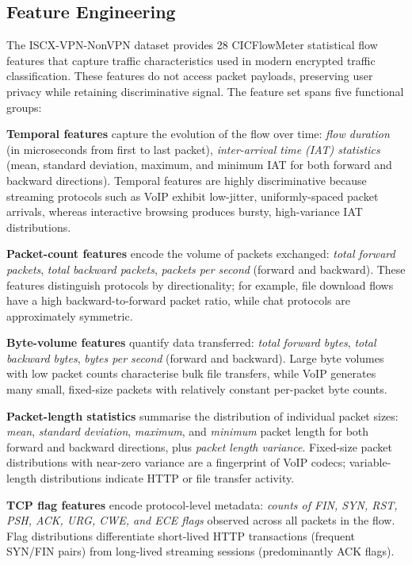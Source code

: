 \documentclass[conference]{IEEEtran}
\begin{document}
\subsection{Feature Engineering}
\label{ssec:features}

The ISCX-VPN-NonVPN dataset provides 28 CICFlowMeter statistical flow features
that capture traffic characteristics used in modern encrypted traffic
classification. These features do not access packet payloads, preserving user
privacy while retaining discriminative signal. The feature set spans five
functional groups:

\textbf{Temporal features} capture the evolution of the flow over time:
\textit{flow duration} (in microseconds from first to last packet),
\textit{inter-arrival time (IAT) statistics} (mean, standard deviation, maximum,
and minimum IAT for both forward and backward directions). Temporal features are
highly discriminative because streaming protocols such as VoIP exhibit low-jitter,
uniformly-spaced packet arrivals, whereas interactive browsing produces bursty,
high-variance IAT distributions.

\textbf{Packet-count features} encode the volume of packets exchanged:
\textit{total forward packets}, \textit{total backward packets},
\textit{packets per second} (forward and backward). These features distinguish
protocols by directionality; for example, file download flows have a high
backward-to-forward packet ratio, while chat protocols are approximately
symmetric.

\textbf{Byte-volume features} quantify data transferred:
\textit{total forward bytes}, \textit{total backward bytes},
\textit{bytes per second} (forward and backward). Large byte volumes with
low packet counts characterise bulk file transfers, while VoIP generates
many small, fixed-size packets with relatively constant per-packet byte counts.

\textbf{Packet-length statistics} summarise the distribution of individual
packet sizes: \textit{mean}, \textit{standard deviation}, \textit{maximum},
and \textit{minimum} packet length for both forward and backward directions,
plus \textit{packet length variance}. Fixed-size packet distributions with
near-zero variance are a fingerprint of VoIP codecs; variable-length
distributions indicate HTTP or file transfer activity.

\textbf{TCP flag features} encode protocol-level metadata:
\textit{counts of FIN, SYN, RST, PSH, ACK, URG, CWE, and ECE flags} observed
across all packets in the flow. Flag distributions differentiate short-lived
HTTP transactions (frequent SYN/FIN pairs) from long-lived streaming sessions
(predominantly ACK flags).
\end{document}
